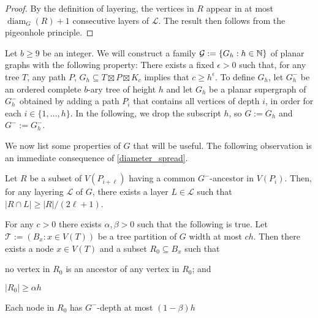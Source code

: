 \documentclass{patmorin}
\newcommand{\defin}[1]{\emph{\color{brightmaroon}#1}}
\DeclareMathOperator{\diam}{diam}
\begin{document}
\begin{proof}
  By the definition of layering, the vertices in $R$ appear in at most $\diam_G(R)+1$ consecutive layers of $\mathcal{L}$. The result then follows from the pigeonhole principle.
\end{proof}


Let $b\ge 9$ be an integer.  We will construct a family $\mathcal{G}:=\{G_h:h\in\mathbb{N}\}$ of planar graphs with the following property:  There exists a fixed $\epsilon >0$ such that, for any tree $T$, any path $P$, $G_h\subseteq T\boxtimes P\boxtimes K_c$ implies that $c\ge h^\epsilon$.  To define $G_h$, let $G_h^-$ be an ordered complete $b$-ary tree of height $h$ and let $G_h$ be a planar supergraph of $G_h^-$ obtained by adding a path $P_i$ that contains all vertices of depth $i$, in order for each $i\in\{1,\ldots,h\}$.   In the following, we drop the subscript $h$, so $G:=G_h$ and $G^-:=G^-_h$.

We now list some properties of $G$ that will be useful.  The following observation is an immediate consequence of \cref{diameter_spread}.

\begin{obs}\label{ancestor_spread}
  Let $R$ be a subset of $V(P_{i+\ell})$ having a common $G^-$-ancestor in $V(P_i)$.  Then, for any layering $\mathcal{L}$ of $G$, there exists a layer $L\in\mathcal{L}$ such that $|R\cap L|\ge |R|/(2\ell+1)$. 
\end{obs}


\begin{lem}
  For any $c>0$ there exists $\alpha,\beta>0$ such that the following is true.
  Let $\mathcal{T}:=(B_x:x\in V(T))$ be a tree partition of $G$ width at most $ch$.  Then there exists a node $x\in V(T)$ and a subset $R_0\subseteq B_x$ such that
  \begin{inparaenum}[(i)]
    \item no vertex in $R_0$ is an ancestor of any vertex in $R_0$; and
    \item $|R_0|\ge \alpha h$
    \item Each node in $R_0$ has $G^-$-depth at most $(1-\beta)h$ 
  \end{inparaenum}
\end{lem}

\end{document}
